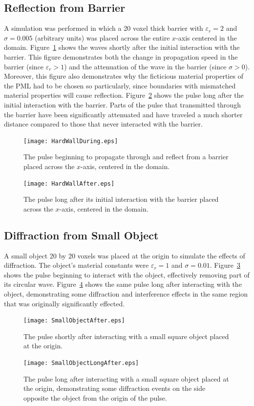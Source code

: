 \documentclass[12pt]{article}
\begin{document}
\begin{multicols}{2}
\subsection{Reflection from Barrier}
A simulation was performed in which a 20 voxel thick barrier with $\varepsilon_r=2$ and $\sigma=0.005$ (arbitrary units) was placed across the entire $x$-axis centered in the domain. Figure~\ref{fig:WallDuring} shows the waves shortly after the initial interaction with the barrier. This figure demonstrates both the change in propagation speed in the barrier (since $\varepsilon_r>1$) and the attenuation of the wave in the barrier (since $\sigma>0$). Moreover, this figure also demonstrates why the ficticious material properties of the PML had to be chosen so particularly, since boundaries with mismatched material properties will cause reflection. Figure~\ref{fig:WallAfter} shows the pulse long after the initial interaction with the barrier. Parts of the pulse that transmitted through the barrier have been significantly attenuated and have traveled a much shorter distance compared to those that never interacted with the barrier.
\begin{figure}[H]
\centering
\texttt{[image: HardWallDuring.eps]}
\caption{The pulse beginning to propagate through and reflect from a barrier placed across the $x$-axis, centered in the domain.}
\label{fig:WallDuring}
\end{figure}
\begin{figure}[H]
\centering
\texttt{[image: HardWallAfter.eps]}
\caption{The pulse long after its initial interaction with the barrier placed across the $x$-axis, centered in the domain.}
\label{fig:WallAfter}
\end{figure}
\subsection{Diffraction from Small Object}
A small object 20 by 20 voxels was placed at the origin to simulate the effects of diffraction. The object's material constants were $\varepsilon_r=1$ and $\sigma=0.01$. Figure~\ref{fig:SmallObjectAfter} shows the pulse beginning to interact with the object, effectively removing part of its circular wave. Figure~\ref{fig:SmallObjectLongAfter} shows the same pulse long after interacting with the object, demonstrating some diffraction and interference effects in the same region that was originally significantly effected.
\begin{figure}[H]
\centering
\texttt{[image: SmallObjectAfter.eps]}
\caption{The pulse shortly after interacting with a small square object placed at the origin.}
\label{fig:SmallObjectAfter}
\end{figure}
\begin{figure}[H]
\centering
\texttt{[image: SmallObjectLongAfter.eps]}
\caption{The pulse long after interacting with a small square object placed at the origin, demonstrating some diffraction events on the side opposite the object from the origin of the pulse.}
\label{fig:SmallObjectLongAfter}
\end{figure}

\end{multicols}
\end{document}
